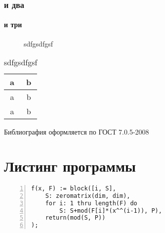 \documentclass[14pt,Diplom,PlagiaryCheck]{diplomwork}
\newcommand{\alert}[1]{{\color{red}#1}}
\begin{document}
\subsection{и два}
\subsubsection{и три}
\begin{figure}[H]
	\caption{sdfgsdfgsf}
	\label{fig:wqewe}
\end{figure}

\begin{table}[H]
	\caption{sdfgsdfgsf}
	\label{tbl:wqewe}
	\begin{tabular}{|c|c|}
		\hline
		a & b \\
		\hline
		a & b \\
		\hline
		a & b \\
		\hline
	\end{tabular}
\end{table}





\begin{thebibliography}{99}
 \alert{Библиография оформляется по ГОСТ 7.0.5-2008} 
\end{thebibliography}

\APPENDIX
\chapter{Листинг программы}
\linespread{1}

\begin{Verbatim}[numbers=left,firstnumber=last,fontsize=\small]
f(x, F) := block([i, S], 
    S: zeromatrix(dim, dim), 
    for i: 1 thru length(F) do
        S: S+mod(F[i]*(x^^(i-1)), P), 
    return(mod(S, P))
);
\end{Verbatim}  
\end{document}
